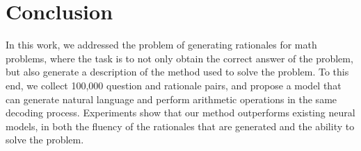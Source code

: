 \section{Conclusion}
In this work, we addressed the problem of generating rationales for math problems, where the task is to not only obtain the correct answer of the problem, but also generate a description of the method used to solve the problem. To this end, we collect 100,000 question and rationale pairs, and propose a model that can generate natural language and perform arithmetic operations in the same decoding process. Experiments show that our method outperforms existing neural models, in both the fluency of the rationales that are generated and the ability to solve the problem.

